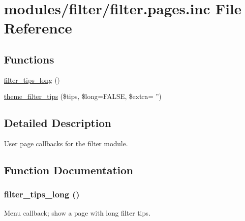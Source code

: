 \hypertarget{filter_8pages_8inc}{
\section{modules/filter/filter.pages.inc File Reference}
\label{filter_8pages_8inc}
}
\subsection*{Functions}
\begin{CompactItemize}
\item 
\hyperlink{filter_8pages_8inc_e4ccdf14ccbf86544bb153048070ef03}{filter\_\-tips\_\-long} ()
\item 
\hyperlink{group__themeable_gfaa023779cae01b4864c8bbec37ab6ff}{theme\_\-filter\_\-tips} (\$tips, \$long=FALSE, \$extra= '')
\end{CompactItemize}


\subsection{Detailed Description}
User page callbacks for the filter module. 

\subsection{Function Documentation}
\hypertarget{filter_8pages_8inc_e4ccdf14ccbf86544bb153048070ef03}{
\subsubsection[{filter\_\-tips\_\-long}]{\setlength{\rightskip}{0pt plus 5cm}filter\_\-tips\_\-long ()}}
\label{filter_8pages_8inc_e4ccdf14ccbf86544bb153048070ef03}


Menu callback; show a page with long filter tips. 
